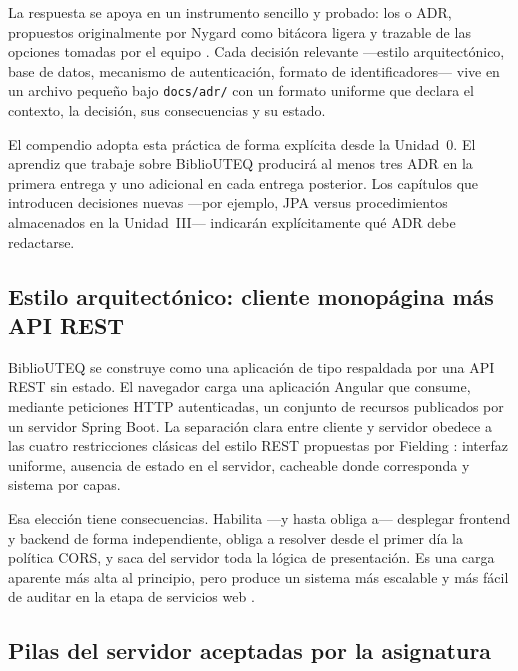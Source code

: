 La respuesta se apoya en un instrumento sencillo y probado: los  o ADR, propuestos originalmente por Nygard como bit\'acora ligera y trazable de las opciones tomadas por el equipo \cite{nygard2011adr}. Cada decisi\'on relevante ---estilo arquitect\'onico, base de datos, mecanismo de autenticaci\'on, formato de identificadores--- vive en un archivo peque\~no bajo \texttt{docs/adr/} con un formato uniforme que declara el contexto, la decisi\'on, sus consecuencias y su estado.

El compendio adopta esta pr\'actica de forma expl\'icita desde la Unidad~0. El aprendiz que trabaje sobre BiblioUTEQ producir\'a al menos tres ADR en la primera entrega y uno adicional en cada entrega posterior. Los cap\'itulos que introducen decisiones nuevas ---por ejemplo, JPA versus procedimientos almacenados en la Unidad~III--- indicar\'an expl\'icitamente qu\'e ADR debe redactarse.

\subsection{Estilo arquitect\'onico: cliente monop\'agina m\'as API REST}
\label{sec:u0:arq:estilo}

BiblioUTEQ se construye como una aplicaci\'on de tipo  respaldada por una API REST sin estado. El navegador carga una aplicaci\'on Angular que consume, mediante peticiones HTTP autenticadas, un conjunto de recursos publicados por un servidor Spring Boot. La separaci\'on clara entre cliente y servidor obedece a las cuatro restricciones cl\'asicas del estilo REST propuestas por Fielding \cite{fielding2000rest}: interfaz uniforme, ausencia de estado en el servidor, cacheable donde corresponda y sistema por capas.

Esa elecci\'on tiene consecuencias. Habilita ---y hasta obliga a--- desplegar frontend y backend de forma independiente, obliga a resolver desde el primer d\'ia la pol\'itica CORS, y saca del servidor toda la l\'ogica de presentaci\'on. Es una carga aparente m\'as alta al principio, pero produce un sistema m\'as escalable y m\'as f\'acil de auditar en la etapa de servicios web \cite{richards2020fundamentals}.

\subsection{Pilas del servidor aceptadas por la asignatura}
\label{sec:u0:arq:pilas}

